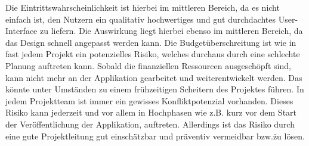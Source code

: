 Die Eintrittswahrscheinlichkeit ist hierbei im mittleren Bereich, da es nicht einfach ist, den Nutzern ein qualitativ hochwertiges und gut durchdachtes User-Interface zu liefern.
Die Auswirkung liegt hierbei ebenso im mittleren Bereich, da das Design schnell angepasst werden kann.\newline
Die Budgetüberschreitung ist wie in fast jedem Projekt ein potenzielles Risiko, welches durchaus durch eine schlechte Planung auftreten kann.
Sobald die finanziellen Ressourcen ausgeschöpft sind, kann nicht mehr an der Applikation gearbeitet und weiterentwickelt werden.
Das könnte unter Umständen zu einem frühzeitigen Scheitern des Projektes führen.\newline
In jedem Projektteam ist immer ein gewisses Konfliktpotenzial vorhanden.
Dieses Risiko kann jederzeit und vor allem in Hochphasen wie z.B. kurz vor dem Start der Veröffentlichung der Applikation, auftreten.
Allerdings ist das Risiko durch eine gute Projektleitung gut einschätzbar und präventiv vermeidbar bzw.\. zu lösen.
